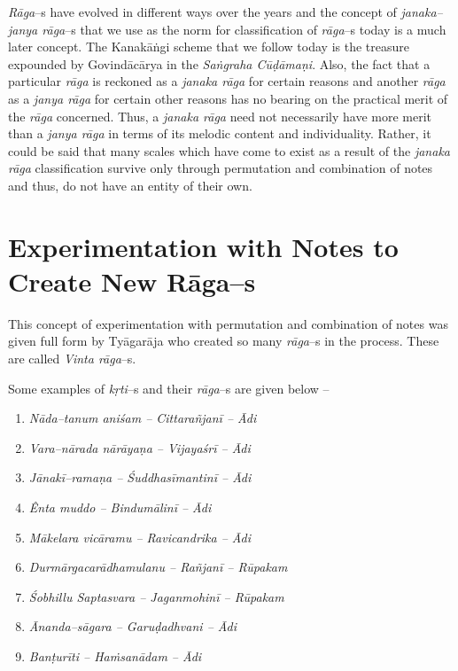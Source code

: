 \textit{Rāga}–s have evolved in different ways over the years and the concept of \textit{janaka–janya rāga}–s that we use as the norm for classification of \textit{rāga}–s today is a much later concept. The Kanakāṅgi scheme that we follow today is the treasure expounded by Govindācārya in the \textit{Saṅgraha Cūḍāmaṇi}. Also, the fact that a particular \textit{rāga} is reckoned as a \textit{janaka rāga} for certain reasons and another \textit{rāga} as a \textit{janya rāga} for certain other reasons has no bearing on the practical merit of the \textit{rāga} concerned. Thus, a \textit{janaka rāga} need not necessarily have more merit than a \textit{janya rāga} in terms of its melodic content and individuality. Rather, it could be said that many scales which have come to exist as a result of the \textit{janaka rāga} classification survive only through permutation and combination of notes and thus, do not have an entity of their own.


\section*{Experimentation with Notes to Create New Rāga–s}

This concept of experimentation with permutation and combination of notes was given full form by Tyāgarāja who created so many \textit{rāga}–s in the process. These are called \textit{Vinta rāga}–s.

Some examples of \textit{kṛti}–s and their \textit{rāga}–s are given below –

\vspace{-.3cm}

\begin{enumerate}
\item \textit{Nāda–tanum aniśam – Cittarañjanī – Ādi}

 \item \textit{Vara–nārada nārāyaṇa – Vijayaśrī – Ādi}

 \item \textit{Jānakī–ramaṇa – Śuddhasīmantinī – Ādi} 

 \item \textit{Ênta muddo – Bindumālinī – Ādi}

 \item \textit{Mākelara vicāramu – Ravicandrika – Ādi}

 \item \textit{Durmārgacarādhamulanu – Rañjanī – Rūpakam}

 \item \textit{Śobhillu Saptasvara – Jaganmohinī – Rūpakam}

 \item \textit{Ānanda–sāgara – Garuḍadhvani – Ādi}

 \item \textit{Banṭurīti – Haṁsanādam – Ādi}

\end{enumerate}

